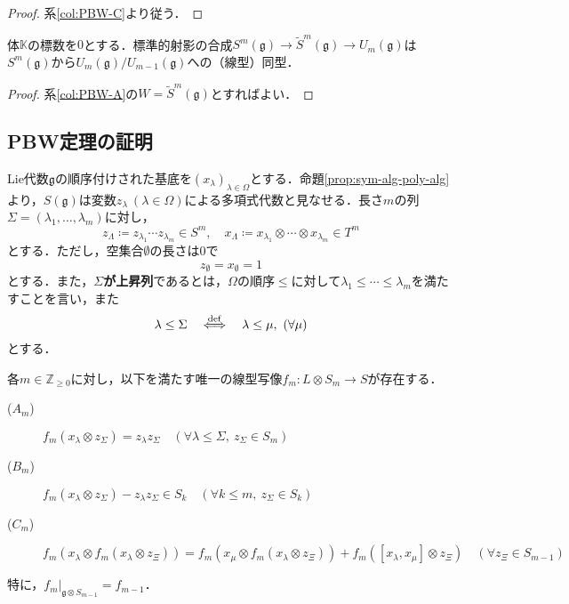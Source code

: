 \documentclass[rep_main]{subfiles}
\begin{document}
\begin{proof}
	系\ref{col:PBW-C}より従う．
\end{proof}
\begin{mycol}[label=col:PBW-E]{}
	体$\mathbb{K}$の標数を$0$とする．標準的射影の合成$S^m(\mathfrak{g}) \to \tilde{S}^m(\mathfrak{g}) \to U_m(\mathfrak{g})$は$S^m(\mathfrak{g})$から$U_m(\mathfrak{g}) / U_{m-1}(\mathfrak{g})$への（線型）同型．
\end{mycol}
\begin{proof}
	系\ref{col:PBW-A}の$W = \tilde{S}^m(\mathfrak{g})$とすればよい．
\end{proof}

\subsection{PBW定理の証明}
Lie代数$\mathfrak{g}$の順序付けされた基底を$(x_\lambda)_{\lambda \in \Omega}$とする．命題\ref{prop:sym-alg-poly-alg}より，$S(\mathfrak{g})$は変数$z_\lambda\ (\lambda \in \Omega)$による多項式代数と見なせる．長さ$m$の列$\Sigma = (\lambda_1, \ldots, \lambda_m)$に対し，
\begin{equation}
	z_\Lambda \coloneqq z_{\lambda_1}\cdots z_{\lambda_m} \in S^m,\quad  x_\Lambda \coloneqq x_{\lambda_1}\otimes\cdots\otimes x_{\lambda_m} \in T^m
\end{equation}
とする．ただし，空集合$\emptyset$の長さは$0$で
\begin{equation}
	z_\emptyset = x_\emptyset = 1
\end{equation}
とする．また，\textbf{$\Sigma$が上昇列}であるとは，$\Omega$の順序$\leq$に対して$\lambda_1 \leq \cdots \leq \lambda_m$を満たすことを言い，また
\begin{equation}
	\lambda \leq \Sigma  \quad\stackrel{\mathrm{def}}{\Longleftrightarrow}\quad  \lambda \leq \mu,\ (\forall \mu)
\end{equation}
とする．
\begin{mylem}[label=lem:PBW-proof-A]{}
	各$m \in \mathbb{Z}_{\geq0}$に対し，以下を満たす唯一の線型写像$f_m\colon L \otimes S_m \to S$が存在する．
	\begin{description}
		\item[($A_m$)] $f_m(x_\lambda \otimes z_{\Sigma}) = z_\lambda z_\Sigma\quad  (\forall \lambda \leq \Sigma,\ z_\Sigma \in S_m)$
		\item[($B_m$)] $f_m(x_\lambda \otimes z_{\Sigma}) - z_\lambda z_\Sigma \in S_k\quad  (\forall k \leq m,\ z_\Sigma \in S_k)$
		\item[($C_m$)] $f_m(x_\lambda \otimes f_m(x_\lambda \otimes z_\Xi)) = f_m(x_\mu \otimes f_m(x_\lambda \otimes z_\Xi)) + f_m([x_\lambda, x_\mu] \otimes z_\Xi)\quad  (\forall z_\Xi \in S_{m-1})$
	\end{description}
	特に，$f_m|_{\mathfrak{g} \otimes S_{m-1}} = f_{m-1}$．
\end{mylem}
\end{document}
